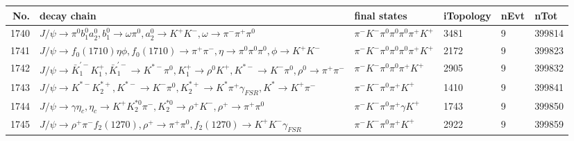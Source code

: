 \begin{table}[htbp] 
\begin{center}
\begin{small}
\begin{tabular}{rlllll}\hline\hline
 No. & decay chain & final states &  iTopology & nEvt & nTot \\\hline
1740&$J/\psi       \rightarrow \pi^{0}        b_{1}^{0}      a_{2}^{0}      , b_{1}^{0}       \rightarrow \omega         \pi^{0}        , a_{2}^{0}       \rightarrow K^{+}          K^{-}          , \omega          \rightarrow \pi^{-}        \pi^{+}        \pi^{0}        $&$\pi^{-}        K^{-}          \pi^{0}        \pi^{0}        \pi^{0}        \pi^{+}        K^{+}          $& 3481&    9&399814\\
1741&$J/\psi       \rightarrow f_{0}(1710)    \eta          \phi           , f_{0}(1710)     \rightarrow \pi^{+}        \pi^{-}        , \eta           \rightarrow \pi^{0}        \pi^{0}        \pi^{0}        , \phi            \rightarrow K^{+}          K^{-}          $&$\pi^{-}        K^{-}          \pi^{0}        \pi^{0}        \pi^{0}        \pi^{+}        K^{+}          $& 2172&    9&399823\\
1742&$J/\psi       \rightarrow \bar{K}_1^{'-}K_1^{+}        , \bar{K}_1^{'-} \rightarrow K^{*-}         \pi^{0}        , K_1^{+}         \rightarrow \rho^{0}      K^{+}          , K^{*-}          \rightarrow K^{-}          \pi^{0}        , \rho^{0}       \rightarrow \pi^{+}        \pi^{-}        $&$\pi^{-}        K^{-}          \pi^{0}        \pi^{0}        \pi^{+}        K^{+}          $& 2905&    9&399832\\
1743&$J/\psi       \rightarrow K^{*-}         K_2^{*+}       , K^{*-}          \rightarrow K^{-}          \pi^{0}        , K_2^{*+}        \rightarrow K^{*}          \pi^{+}        \gamma_{FSR} , K^{*}           \rightarrow K^{+}          \pi^{-}        $&$\pi^{-}        K^{-}          \pi^{0}        \pi^{+}        K^{+}          $& 1410&    9&399841\\
1744&$J/\psi       \rightarrow \gamma       \eta_{c}    , \eta_{c}     \rightarrow K^{+}          K_2^{*0}       \pi^{-}        , K_2^{*0}        \rightarrow \rho^{+}      K^{-}          , \rho^{+}       \rightarrow \pi^{+}        \pi^{0}        $&$\pi^{-}        K^{-}          \pi^{0}        \pi^{+}        \gamma       K^{+}          $& 1743&    9&399850\\
1745&$J/\psi       \rightarrow \rho^{+}      \pi^{-}        f_{2}(1270)    , \rho^{+}       \rightarrow \pi^{+}        \pi^{0}        , f_{2}(1270)     \rightarrow K^{+}          K^{-}          \gamma_{FSR} $&$\pi^{-}        K^{-}          \pi^{0}        \pi^{+}        K^{+}          $& 2922&    9&399859\\

\end{tabular}
\end{small}
\end{center}
\end{table}
